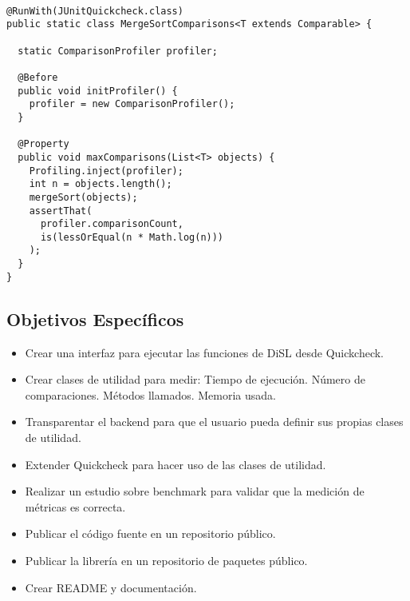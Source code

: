 \begin{verbatim}

@RunWith(JUnitQuickcheck.class)
public static class MergeSortComparisons<T extends Comparable> {

  static ComparisonProfiler profiler;

  @Before
  public void initProfiler() {
    profiler = new ComparisonProfiler();
  }

  @Property
  public void maxComparisons(List<T> objects) {
    Profiling.inject(profiler);
    int n = objects.length();
    mergeSort(objects);
    assertThat(
      profiler.comparisonCount,
      is(lessOrEqual(n * Math.log(n)))
    );
  }
}
\end{verbatim}
\newpage

\linespread{1.5}
\subsection*{Objetivos Específicos}\label{sec:obj-e}
\begin{itemize}
\item Crear una interfaz para ejecutar las funciones de DiSL desde Quickcheck.
\item Crear clases de utilidad para medir:
\subitem Tiempo de ejecución.
\subitem Número de comparaciones.
\subitem Métodos llamados.
\subitem Memoria usada.
\item Transparentar el backend para que el usuario pueda definir sus propias
  clases de utilidad.
\item Extender Quickcheck para hacer uso de las clases de utilidad.
\item Realizar un estudio sobre benchmark para validar que la medición de
  métricas es correcta.
\item Publicar el código fuente en un repositorio público.
\item Publicar la librería en un repositorio de paquetes público.
\item Crear README y documentación.
\end{itemize}

